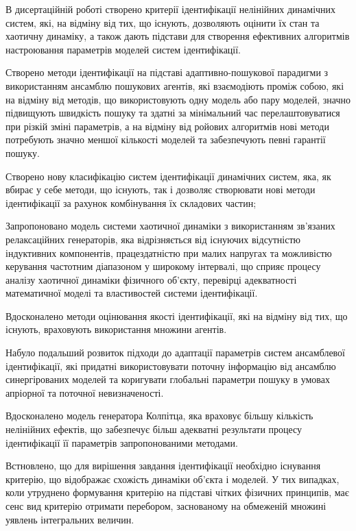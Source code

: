 В дисертаційній роботі
  створено критерії ідентифікації нелінійних динамічних систем,
  які, на відміну від тих, що існують, дозволяють оцінити їх стан та
  хаотичну динаміку, а також дають підстави для створення ефективних алгоритмів
  настроювання параметрів моделей систем ідентифікації.

Створено методи ідентифікації на підставі
  адаптивно-пошукової парадигми з використанням ансамблю пошукових агентів,
  які взаємодіють проміж собою, які на відміну від методів, що використовують
  одну модель або пару моделей, значно підвищують швидкість пошуку та
  здатні за мінімальний час  перелаштовуватися при різкій зміні параметрів, а на
  відміну від ройових алгоритмів нові методи потребують значно меншої
  кількості моделей та забезпечують певні гарантії пошуку.

Створено нову класифікацію систем ідентифікації динамічних систем,
  яка, як вбирає у себе методи, що існують, так і дозволяє
  створювати нові методи ідентифікації за рахунок
  комбінування їх складових частин;

Запропоновано модель системи хаотичної динаміки
   з використанням зв'язаних релаксаційних генераторів,
   яка відрізняється від існуючих відсутністю індуктивних компонентів,
   працездатністю при малих напругах та можливістю
   керування частотним діапазоном у широкому інтервалі,
   що сприяє процесу аналізу хаотичної динаміки
   фізичного об'єкту, перевірці адекватності математичної моделі
   та властивостей системи ідентифікації.

Вдосконалено
  методи оцінювання якості ідентифікації,
  які на відміну від тих, що існують,
  враховують використання множини агентів.

Набуло подальший розвиток
  підходи до адаптації параметрів систем
  ансамблевої ідентифікації, які придатні використовувати поточну
  інформацію від ансамблю синергірованих моделей та коригувати глобальні
  параметри пошуку в умовах апріорної та поточної невизначеності.

Вдосконалено
модель генератора Колпітца, яка враховує
    більшу кількість нелінійних ефектів,
    що забезпечує більш адекватні результати процесу
    ідентифікації її параметрів запропонованими методами.

Встновлено, що
для вирішення завдання ідентифікації необхідно існування
критерію, що відображає схожість динаміки об'єкта і моделей.
    У тих випадках, коли утруднено формування критерію на
    підставі чітких фізичних принципів, має сенс вид критерію
    отримати перебором, заснованому на обмеженій множині уявлень
    інтегральних величин.

